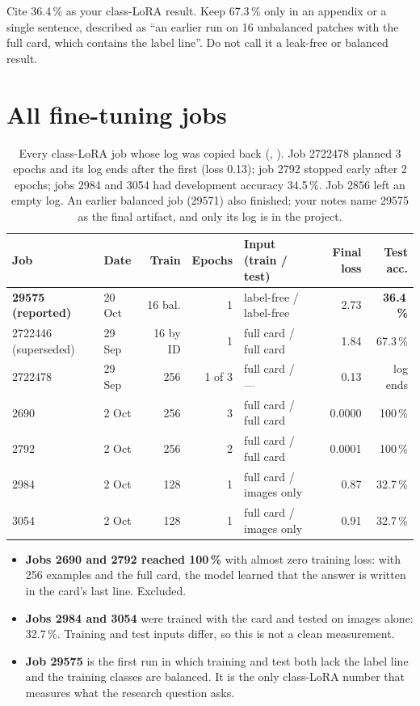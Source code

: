 \begin{newinfo}
Cite 36.4\,\% as your class-LoRA result. Keep 67.3\,\% only in an appendix or a single sentence, described as ``an earlier run on 16 unbalanced patches with the full card, which contains the label line''. Do not call it a leak-free or balanced result.
\end{newinfo}

\section{All fine-tuning jobs}

\begin{table}[H]
\centering
\caption{Every class-LoRA job whose log was copied back (, ). Job 2722478 planned 3 epochs and its log ends after the first (loss 0.13); job 2792 stopped early after 2 epochs; jobs 2984 and 3054 had development accuracy 34.5\,\%. Job 2856 left an empty log. An earlier balanced job (29571) also finished; your notes name 29575 as the final artifact, and only its log is in the project.}
\label{tab:ftruns}
\small
\begin{tabular}{llrrlrr}
\toprule
Job & Date & Train & Epochs & Input (train / test) & Final loss & Test acc. \\
\midrule
\textbf{29575 (reported)} & 20 Oct & 16 bal. & 1 & label-free / label-free & 2.73 & \textbf{36.4\,\%} \\
2722446 (superseded) & 29 Sep & 16 by ID & 1 & full card / full card & 1.84 & 67.3\,\% \\
2722478 & 29 Sep & 256 & 1 of 3 & full card / --- & 0.13 & log ends \\
2690 & 2 Oct & 256 & 3 & full card / full card & 0.0000 & 100\,\% \\
2792 & 2 Oct & 256 & 2 & full card / full card & 0.0001 & 100\,\% \\
2984 & 2 Oct & 128 & 1 & full card / images only & 0.87 & 32.7\,\% \\
3054 & 2 Oct & 128 & 1 & full card / images only & 0.91 & 32.7\,\% \\
\bottomrule
\end{tabular}
\end{table}

\begin{itemize}
  \item \textbf{Jobs 2690 and 2792 reached 100\,\%} with almost zero training loss: with 256 examples and the full card, the model learned that the answer is written in the card's last line. Excluded.
  \item \textbf{Jobs 2984 and 3054} were trained with the card and tested on images alone: 32.7\,\%. Training and test inputs differ, so this is not a clean measurement.
  \item \textbf{Job 29575} is the first run in which training and test both lack the label line and the training classes are balanced. It is the only class-LoRA number that measures what the research question asks.
\end{itemize}

